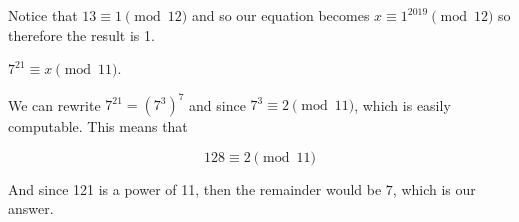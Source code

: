 \documentclass[11pt]{article}
\begin{document}
\begin{Parts}
\begin{solution}
  Notice that $13 \equiv 1 \pmod {12}$ and so our equation becomes $x \equiv 1^{2019} \pmod {12}$ so therefore the result is 1.
\end{solution}
\Part $7^{21} \equiv x \pmod{11}$.

\begin{solution}
  We can rewrite $7^{21} = \left(7^{3}\right)^7$ and since $7^3 \equiv 2 \pmod{11}$, which is easily computable. This means that 

  \[ 128 \equiv 2 \pmod {11}\]

  And since 121 is a power of 11, then the remainder would be $7$, which is our answer.
\end{solution}

\end{Parts}
\pagebreak
{}
\end{document}

